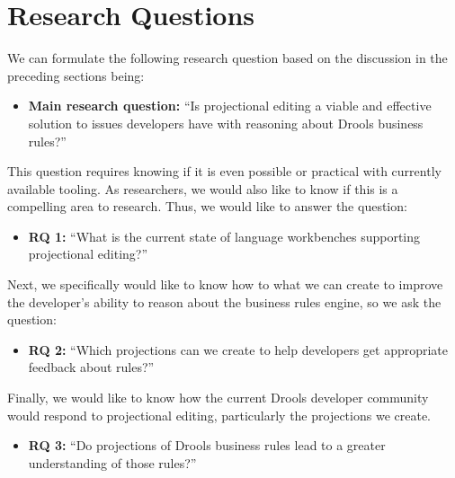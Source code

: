 \section{Research Questions}
\label{section:Research_Questions}

We can formulate the following research question based on the discussion in the preceding sections being:

\begin{itemize}
    \setlength\itemsep{0em}
    \item \textbf{Main research question:} ``Is projectional editing a viable and effective solution to issues developers have with reasoning about Drools business rules?''
\end{itemize}

This question requires knowing if it is even possible or practical with currently available tooling. 
As researchers, we would also like to know if this is a compelling area to research. 
Thus, we would like to answer the question:
\begin{itemize}
    \setlength\itemsep{0em}
    \item \textbf{RQ 1:} ``What is the current state of language workbenches supporting projectional editing?''
\end{itemize}

Next, we specifically would like to know how to what we can create to improve the developer's ability to reason about the business rules engine, so we ask the question:
\begin{itemize}
    \setlength\itemsep{0em}
    \item \textbf{RQ 2:} ``Which projections can we create to help developers get appropriate feedback about rules?''
\end{itemize}

Finally, we would like to know how the current Drools developer community would respond to projectional editing, particularly the projections we create.
\begin{itemize}
    \setlength\itemsep{0em}
    \item  \textbf{RQ 3:} ``Do projections of Drools business rules lead to a greater understanding of those rules?''
\end{itemize}